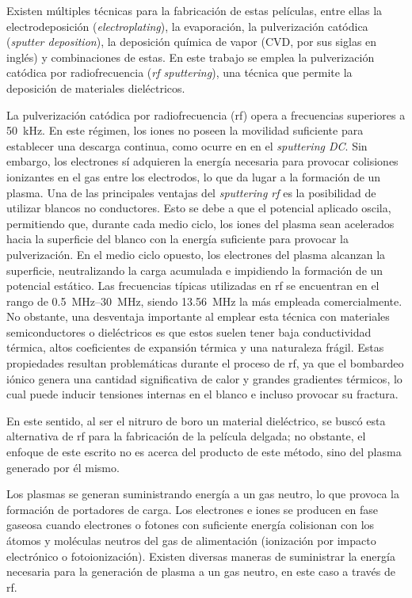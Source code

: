 \documentclass[12pt]{IEEEtran}
\begin{document}
Existen múltiples técnicas para la fabricación de estas películas, entre ellas la electrodeposición (\emph{electroplating}), la evaporación, la pulverización catódica (\emph{sputter deposition}), la deposición química de vapor  (CVD, por sus siglas en inglés) y combinaciones de estas. En este trabajo se emplea la pulverización catódica por radiofrecuencia (\emph{rf sputtering}), una técnica que permite la deposición de materiales dieléctricos.

La pulverización catódica por radiofrecuencia (rf) opera a frecuencias superiores a \qty{50}{\kHz}. En este régimen, los iones no poseen la movilidad suficiente para establecer una descarga continua, como ocurre en en el \emph{sputtering DC}. Sin embargo, los electrones sí adquieren la energía necesaria para provocar colisiones ionizantes en el gas entre los electrodos, lo que da lugar a la formación de un plasma.
Una de las principales ventajas del \emph{sputtering rf} es la posibilidad de utilizar blancos no conductores. Esto se debe a que el potencial aplicado oscila, permitiendo que, durante cada medio ciclo, los iones del plasma sean acelerados hacia la superficie del blanco con la energía suficiente para provocar la pulverización. En el medio ciclo opuesto, los electrones del plasma alcanzan la superficie, neutralizando la carga acumulada e impidiendo la formación de un potencial estático.
Las frecuencias típicas utilizadas en rf se encuentran en el rango de \qtyrange[range-units=single]{0.5}{30}{\MHz}, siendo \qty{13.56}{\MHz} la más empleada comercialmente.\cite{antaritagutierrezSintesisPeliculasDelgadas2017,mattoxChapter7Physical2010}
No obstante, una desventaja importante al emplear esta técnica con materiales semiconductores o dieléctricos es que estos suelen tener baja conductividad térmica, altos coeficientes de expansión térmica y una naturaleza frágil. Estas propiedades resultan problemáticas durante el proceso de rf, ya que el bombardeo iónico genera una cantidad significativa de calor y grandes gradientes térmicos, lo cual puede inducir tensiones internas en el blanco e incluso provocar su fractura.

En este sentido, al ser el nitruro de boro un material dieléctrico, se buscó esta alternativa de rf para la fabricación de la película delgada; no obstante, el enfoque de este escrito no es acerca del producto de este método, sino del plasma generado por él mismo.

Los plasmas se generan suministrando energía a un gas neutro, lo que provoca la formación de portadores de carga. Los electrones e iones se producen en fase gaseosa cuando electrones o fotones con suficiente energía colisionan con los átomos y moléculas neutros del gas de alimentación (ionización por impacto electrónico o fotoionización). Existen diversas maneras de suministrar la energía necesaria para la generación de plasma a un gas neutro, en este caso a través de rf.\cite{mattoxChapter7Physical2010}
\end{document}
